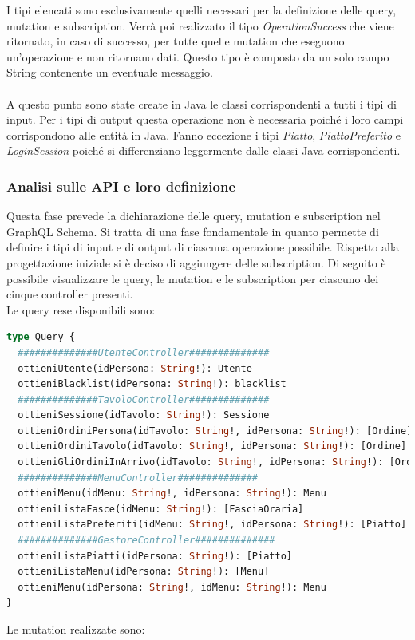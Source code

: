 I tipi elencati sono esclusivamente quelli necessari per la definizione delle query, mutation e subscription. Verrà poi realizzato il tipo \textit{OperationSuccess} che viene ritornato, in caso di successo, per tutte quelle mutation che eseguono un'operazione e non ritornano dati. Questo tipo è composto da un solo campo String contenente un eventuale messaggio.\\ \\
A questo punto sono state create in Java le classi corrispondenti a tutti i tipi di input. Per i tipi di output questa operazione non è necessaria poiché i loro campi corrispondono alle entità in Java. Fanno eccezione i tipi \textit{Piatto}, \textit{PiattoPreferito} e \textit{LoginSession} poiché si differenziano leggermente dalle classi Java corrispondenti.
\subsubsection*{Analisi sulle API e loro definizione}
Questa fase prevede la dichiarazione delle query, mutation e subscription nel GraphQL Schema. Si tratta di una fase fondamentale in quanto permette di definire i tipi di input e di output di ciascuna operazione possibile. Rispetto alla progettazione iniziale si è deciso di aggiungere delle subscription. Di seguito è possibile visualizzare le query, le mutation e le subscription per ciascuno dei cinque controller presenti.\\
Le query rese disponibili sono:
\begin{lstlisting}[language=GraphQL, title={schema.graphqls}]
type Query {
  ##############UtenteController##############
  ottieniUtente(idPersona: String!): Utente
  ottieniBlacklist(idPersona: String!): blacklist
  ##############TavoloController##############
  ottieniSessione(idTavolo: String!): Sessione
  ottieniOrdiniPersona(idTavolo: String!, idPersona: String!): [Ordine]
  ottieniOrdiniTavolo(idTavolo: String!, idPersona: String!): [Ordine]
  ottieniGliOrdiniInArrivo(idTavolo: String!, idPersona: String!): [Ordine]
  ##############MenuController##############
  ottieniMenu(idMenu: String!, idPersona: String!): Menu
  ottieniListaFasce(idMenu: String!): [FasciaOraria]
  ottieniListaPreferiti(idMenu: String!, idPersona: String!): [Piatto]
  ##############GestoreController##############
  ottieniListaPiatti(idPersona: String!): [Piatto]
  ottieniListaMenu(idPersona: String!): [Menu]
  ottieniMenu(idPersona: String!, idMenu: String!): Menu
}
\end{lstlisting}
Le mutation realizzate sono:
